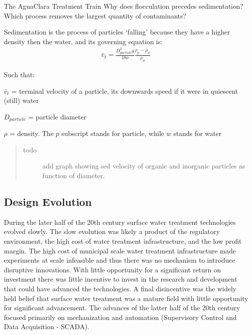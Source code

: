 \documentclass[letterpaper,10pt,english]{sphinxmanual}
\begin{document}
The AguaClara Treatment Train
Why does flocculation precedes sedimentation?
Which process removes the largest quantity of contaminants?

Sedimentation is the process of particles ‘falling’ because they have a higher density then the water, and its governing equation is:
\begin{equation}\label{equation:Introduction/Introduction:Introduction/Introduction:0}
\begin{split}\bar v_t = \frac{D_{particle}^2 g}{18 \nu} \frac{\rho_p - \rho_w}{\rho_w}\end{split}
\end{equation}
\begin{DUlineblock}{0em}
\item[] Such that:
\item[] \(\bar v_t\) = terminal velocity of a particle, its downwards speed if it were in quiescent (still) water
\item[] \(D_{particle}\) = particle diameter
\item[] \(\rho\) = density. The \(p\) subscript stands for particle, while \(w\) stands for water
\end{DUlineblock}
\begin{quote}\begin{description}
\item[{todo}] \leavevmode
add graph showing sed velocity of organic and inorganic particles as function of diameter.

\end{description}\end{quote}


\subsection{Design Evolution}
\label{\detokenize{Introduction/Introduction:design-evolution}}
During the later half of the 20th century surface water treatment technologies evolved slowly. The slow evolution was likely a product of the regulatory environment, the high cost of water treatment infrastructure, and the low profit margin. The high cost of municipal scale water treatment infrastructure made experiments at scale infeasible and thus there was no mechanism to introduce disruptive innovations. With little opportunity for a significant return on investment there was little incentive to invest in the research and development that could have advanced the technologies. A final disincentive was the widely held belief that surface water treatment was a mature field with little opportunity for significant advancement. The advances of the latter half of the 20th century focused primarily on mechanization and automation (Supervisory Control and Data Acquisition - SCADA).
\end{document}
